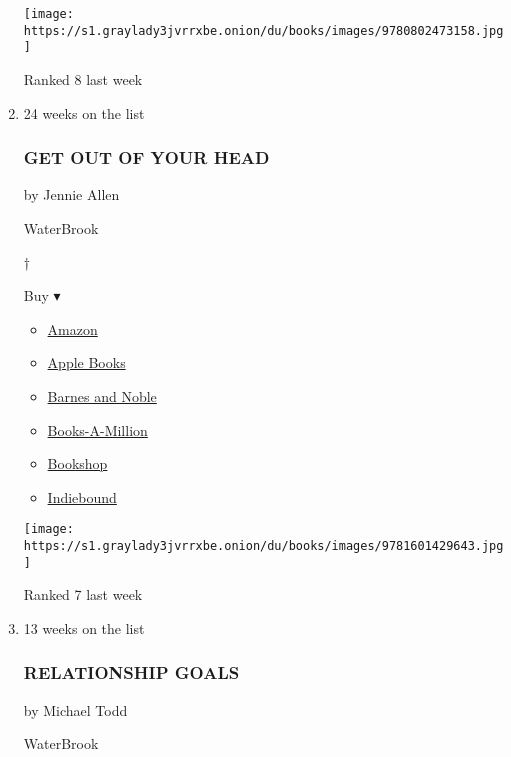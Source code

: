 \begin{enumerate}
  \texttt{[image: https://s1.graylady3jvrrxbe.onion/du/books/images/9780802473158.jpg]}

  Ranked 8 last week
\item
  24 weeks on the list

  \hypertarget{get-out-of-your-head}{%
  \subsubsection{GET OUT OF YOUR HEAD}\label{get-out-of-your-head}}

  by Jennie Allen

  WaterBrook

  †

  Buy ▾

  \begin{itemize}
  \tightlist
  \item
    \href{https://www.amazon.com/Get-Out-Your-Head-Stopping/dp/1601429649?tag=NYTBS-20}{Amazon}
  \item
    \href{https://du-gae-books-dot-nyt-du-prd.appspot.com/buy?title=GET+OUT+OF+YOUR+HEAD\&author=Jennie+Allen}{Apple
    Books}
  \item
    \href{https://www.anrdoezrs.net/click-7990613-11819508?url=https\%3A\%2F\%2Fwww.barnesandnoble.com\%2Fw\%2F\%3Fean\%3D9781601429643}{Barnes
    and Noble}
  \item
    \href{https://www.anrdoezrs.net/click-7990613-35140?url=https\%3A\%2F\%2Fwww.booksamillion.com\%2Fp\%2FGET\%2BOUT\%2BOF\%2BYOUR\%2BHEAD\%2FJennie\%2BAllen\%2F9781601429643}{Books-A-Million}
  \item
    \href{https://bookshop.org/a/3546/9781601429643}{Bookshop}
  \item
    \href{https://www.indiebound.org/book/9781601429643?aff=NYT}{Indiebound}
  \end{itemize}

  \texttt{[image: https://s1.graylady3jvrrxbe.onion/du/books/images/9781601429643.jpg]}

  Ranked 7 last week
\item
  13 weeks on the list

  \hypertarget{relationship-goals}{%
  \subsubsection{RELATIONSHIP GOALS}\label{relationship-goals}}

  by Michael Todd

  WaterBrook


\end{enumerate}
